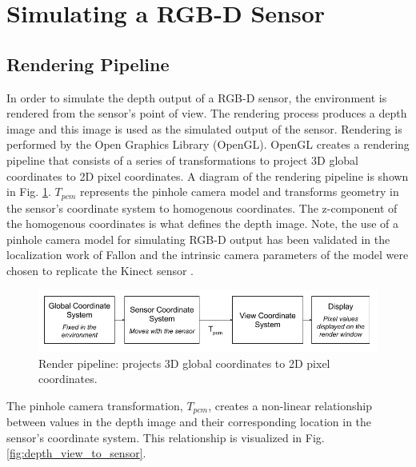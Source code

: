 \section{Simulating a RGB-D Sensor}



\subsection{Rendering Pipeline}

In order to simulate the depth output of a RGB-D sensor, the environment is
rendered from the sensor's point of view. The rendering process produces a depth
image and this image is used as the simulated output of the sensor. Rendering is
performed by the Open Graphics Library (OpenGL). OpenGL creates a rendering
pipeline that consists of a series of transformations to project 3D global
coordinates to 2D pixel coordinates. A diagram of the rendering pipeline is
shown in Fig. \ref{fig:render_pipeline}. $T_{pcm}$ represents the pinhole
camera model and transforms geometry in the sensor's coordinate system to
homogenous coordinates. The z-component of the homogenous coordinates is what
defines the depth image. Note, the use of a pinhole camera model for simulating
RGB-D output has been validated in the localization work of Fallon
\cite{Fallon2012} and the intrinsic camera parameters of the model were chosen
to replicate the Kinect sensor \cite{sitekinectspecs}.

\begin{figure}[h]%
\centering
  \includegraphics[width=\textwidth]{figures/diagram_render_pipeline.png}
  \caption{Render pipeline: projects 3D global coordinates to 2D pixel coordinates. }
  \label{fig:render_pipeline}
\end{figure}

The pinhole camera transformation, $T_{pcm}$, creates a non-linear relationship between
values in the depth image and their corresponding location in the sensor's
coordinate system. This relationship is visualized in Fig.
\ref{fig:depth_view_to_sensor}.

